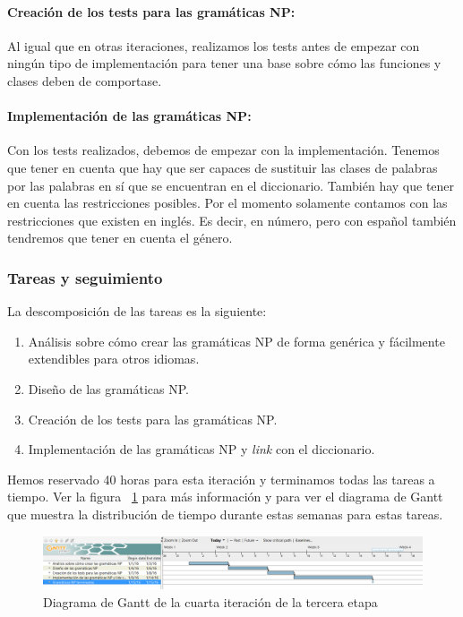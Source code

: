 \paragraph{Creación de los tests para las gramáticas NP:} Al igual que en otras iteraciones, realizamos los tests antes de empezar con ningún tipo de implementación para tener una base sobre cómo las funciones y clases deben de comportase.

\paragraph{Implementación de las gramáticas NP:} Con los tests realizados, debemos de empezar con la implementación. Tenemos que tener en cuenta que hay que ser capaces de sustituir las clases de palabras por las palabras en sí que se encuentran en el diccionario. También hay que tener en cuenta las restricciones posibles. Por el momento solamente contamos con las restricciones que existen en inglés. Es decir, en número, pero con español también tendremos que tener en cuenta el género.

\subsubsection{Tareas y seguimiento}

La descomposición de las tareas es la siguiente:

\begin{enumerate}[label=\bfseries WBS 4.\arabic*]
  \item Análisis sobre cómo crear las gramáticas NP de forma genérica y fácilmente extendibles para otros idiomas.
  \item Diseño de las gramáticas NP.
  \item Creación de los tests para las gramáticas NP.
  \item Implementación de las gramáticas NP y \textit{link} con el diccionario.
\end{enumerate}

Hemos reservado 40 horas para esta iteración y terminamos todas las tareas a tiempo. Ver la figura ~\ref{fig:sec3it4} para más información y para ver el diagrama de Gantt que muestra la distribución de tiempo durante estas semanas para estas tareas.

\begin{figure}
    \includegraphics[width=\textwidth,height=\textheight,keepaspectratio]{./img/sec3it4.png}
  \caption{Diagrama de Gantt de la cuarta iteración de la tercera etapa}
  \label{fig:sec3it4}
\end{figure}

